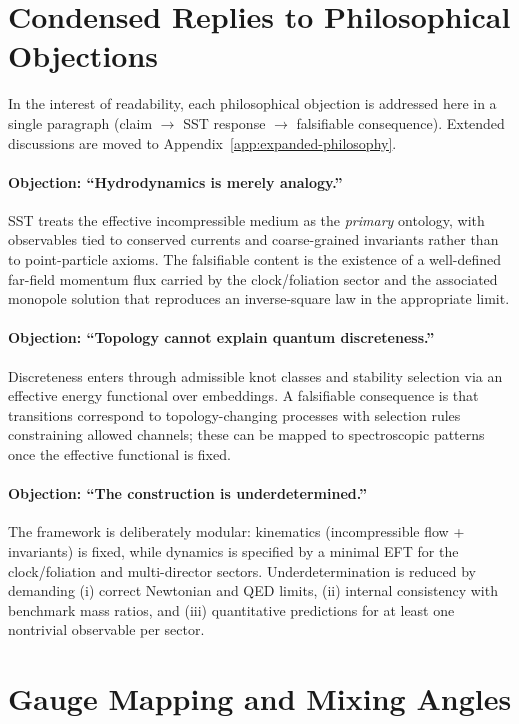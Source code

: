 \documentclass[10pt]{article}
\begin{document}
\section{Condensed Replies to Philosophical Objections}
\label{sec:v075-philosophy}

In the interest of readability, each philosophical objection is addressed here
in a single paragraph (claim $\rightarrow$ SST response $\rightarrow$ falsifiable
consequence). Extended discussions are moved to Appendix~\ref{app:expanded-philosophy}.

\paragraph{Objection: ``Hydrodynamics is merely analogy.''}
SST treats the effective incompressible medium as the \emph{primary} ontology,
with observables tied to conserved currents and coarse-grained invariants rather
than to point-particle axioms. The falsifiable content is the existence of a
well-defined far-field momentum flux carried by the clock/foliation sector and
the associated monopole solution that reproduces an inverse-square law in the
appropriate limit.

\paragraph{Objection: ``Topology cannot explain quantum discreteness.''}
Discreteness enters through admissible knot classes and stability selection
via an effective energy functional over embeddings. A falsifiable consequence is
that transitions correspond to topology-changing processes with selection rules
constraining allowed channels; these can be mapped to spectroscopic patterns once
the effective functional is fixed.

\paragraph{Objection: ``The construction is underdetermined.''}
The framework is deliberately modular: kinematics (incompressible flow + invariants)
is fixed, while dynamics is specified by a minimal EFT for the clock/foliation and
multi-director sectors. Underdetermination is reduced by demanding (i) correct
Newtonian and QED limits, (ii) internal consistency with benchmark mass ratios,
and (iii) quantitative predictions for at least one nontrivial observable per sector.


\section{Gauge Mapping and Mixing Angles}
\label{sec:v075-mixing}
\end{document}
